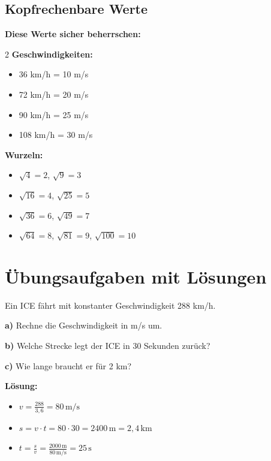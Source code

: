 \documentclass[11pt,a4paper]{article}
\begin{document}
\subsection{Kopfrechenbare Werte}

\begin{tipp}
\textbf{Diese Werte sicher beherrschen:}
\begin{multicols}{2}
\textbf{Geschwindigkeiten:}
\begin{itemize}
\item 36 km/h = 10 m/s
\item 72 km/h = 20 m/s
\item 90 km/h = 25 m/s
\item 108 km/h = 30 m/s
\end{itemize}

\columnbreak

\textbf{Wurzeln:}
\begin{itemize}
\item $\sqrt{4} = 2$, $\sqrt{9} = 3$
\item $\sqrt{16} = 4$, $\sqrt{25} = 5$
\item $\sqrt{36} = 6$, $\sqrt{49} = 7$
\item $\sqrt{64} = 8$, $\sqrt{81} = 9$, $\sqrt{100} = 10$
\end{itemize}
\end{multicols}
\end{tipp}

\newpage
\section{Übungsaufgaben mit Lösungen}

\begin{aufgabe}
Ein ICE fährt mit konstanter Geschwindigkeit 288 km/h.

\textbf{a)} Rechne die Geschwindigkeit in m/s um.

\textbf{b)} Welche Strecke legt der ICE in 30 Sekunden zurück?

\textbf{c)} Wie lange braucht er für 2 km?
\end{aufgabe}

\textbf{Lösung:}
\begin{itemize}
\item[a)] $v = \frac{288}{3{,}6} = 80\,\mathrm{m/s}$
\item[b)] $s = v \cdot t = 80 \cdot 30 = 2400\,\mathrm{m} = 2{,}4\,\mathrm{km}$
\item[c)] $t = \frac{s}{v} = \frac{2000\,\mathrm{m}}{80\,\mathrm{m/s}} = 25\,\mathrm{s}$
\end{itemize}
\end{document}
